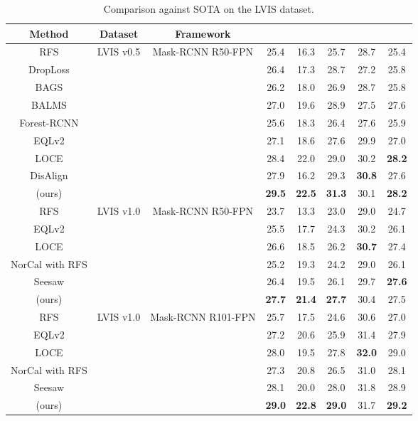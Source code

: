 \documentclass[runningheads]{llncs}
\begin{document}
\begin{table*}
    \centering
        \caption{Comparison against SOTA on the LVIS dataset.}
        \begin{tabular}{c|c|c|ccccc}
        Method&Dataset&Framework &&&&& \\
         \hline
        RFS \cite{gupta2019lvis}&\multirow{ 9}{*}{LVIS v0.5}&\multirow{ 9}{*}{Mask-RCNN R50-FPN}&25.4&16.3&25.7&28.7&25.4 \\
        DropLoss\cite{hsieh2021droploss}&&&26.4&17.3&28.7&27.2&25.8 \\
        BAGS \cite{li2020overcoming}& & &26.2&18.0&26.9&28.7&25.8 \\
        BALMS\cite{Ren2020balms}& & &27.0&19.6&28.9&27.5&27.6\\
        Forest-RCNN\cite{wu2020forest}& & &25.6&18.3&26.4&27.6&25.9 \\
        EQLv2\cite{tan2021equalization}& & &27.1&18.6&27.6&29.9&27.0\\
        LOCE\cite{feng2021exploring}& & &28.4 &22.0&29.0&30.2&\textbf{28.2}\\
        DisAlign \cite{zhang2021distribution}& & &27.9 &16.2&29.3&\textbf{30.8}&27.6\\
         (ours) & & &\textbf{29.5} &\textbf{22.5}&\textbf{31.3}&30.1&\textbf{28.2}\\
        \hline
        RFS\cite{gupta2019lvis}&\multirow{6}{*}{LVIS v1.0}&\multirow{6}{*}{Mask-RCNN R50-FPN}&23.7&13.3&23.0&29.0&24.7\\
         EQLv2\cite{tan2021equalization}&&&25.5&17.7&24.3&30.2&26.1\\
          LOCE\cite{feng2021exploring}& & &26.6 &18.5 &26.2&\textbf{30.7}&27.4\\
         NorCal with RFS \cite{pan2021model}&&&25.2&19.3&24.2&29.0&26.1\\
         Seesaw\cite{wang2021seesaw}&&&26.4 &19.5&26.1&29.7&\textbf{27.6}\\
          (ours)&& &\textbf{27.7}&\textbf{21.4}&\textbf{27.7}&30.4&27.5\\
         \hline
         RFS \cite{gupta2019lvis}&\multirow{6}{*}{LVIS v1.0}&\multirow{6}{*}{Mask-RCNN R101-FPN}&25.7&17.5&24.6&30.6&27.0\\
         EQLv2\cite{tan2021equalization}&&&27.2&20.6&25.9&31.4&27.9\\

         LOCE\cite{feng2021exploring}&&&28.0 &19.5 &27.8&\textbf{32.0}&29.0\\
         NorCal with RFS \cite{pan2021model}&&&27.3&20.8&26.5&31.0&28.1\\
         Seesaw\cite{wang2021seesaw}&&&28.1&20.0&28.0&31.8&28.9\\
         (ours)&&&\textbf{29.0}&\textbf{22.8}&\textbf{29.0}&31.7&\textbf{29.2}\\
    \end{tabular}
    \label{tab:sota}
\end{table*}
\end{document}
